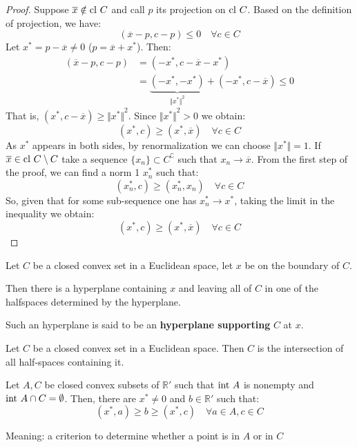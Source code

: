 \documentclass[../main.tex]{subfiles}
\begin{document}
\begin{proof}
    Suppose $\overline{x} \notin \operatorname{cl\,} C$ and call $p$ its projection on $\operatorname{cl\,} C$. Based on the definition of projection, we have:
    \[
        (\overline{x} - p, c - p) \leq 0 \quad \forall c \in C
    \]
    Let $x^* = p - \overline{x} \neq 0$ ($p = \overline{x} + x^*$). Then:
    \begin{align*}
        (\overline{x} - p, c - p) & = (-x^*, c - \overline{x} - x^*)                                                    \\
                                  & = \underbrace{(-x^*, -x^*)}_{{\Vert x^* \Vert}^2} + (-x^*, c - \overline{x}) \leq 0
    \end{align*}
    That is, $(x^*, c - \overline{x}) \geq {\Vert x^* \Vert}^2$. Since ${\Vert x^* \Vert}^2 > 0$ we obtain:
    \[
        (x^*, c)  \geq (x^*, \overline{x}) \quad \forall c \in C
    \]
    As $x^*$ appears in both sides, by renormalization we can choose $\Vert x^* \Vert = 1$. If $\overline{x} \in \operatorname{cl\,} C \setminus  C$ take a sequence  $\{x_n\} \subset C^\complement$ such that $x_n \to \overline{x}$. From the first step of the proof, we can find a norm 1 $x^*_n$ such that:
    \[
        (x^*_n, c) \geq (x^*_n, x_n) \quad \forall c \in C
    \]
    So, given that for some sub-sequence one has $x_n^* \to x^*$, taking the limit in the inequality we obtain:
    \[
        (x^*, c) \geq (x^*, \overline{x}) \quad \forall c \in C
    \]
\end{proof}
\begin{corollary}
    Let $C$ be a closed convex set in a Euclidean space, let $x$ be on the boundary of $C$.

    Then there is a hyperplane containing $x$ and leaving all of $C$ in one of the halfspaces determined by the hyperplane.

    Such an hyperplane is said to be an \textbf{hyperplane supporting} $C$ at $x$.
\end{corollary}
\begin{corollary}
    Let $C$ be a closed convex set in a Euclidean space. Then $C$ is the intersection of all half-spaces containing it.
\end{corollary}

\begin{theorem}
    Let $A, C$ be closed convex subsets of $\mathbb{R}'$ such that $\operatorname{int\,} A$ is nonempty and $\operatorname{int\,} A \cap C = \emptyset$. Then, there are  $x^* \neq 0$ and $b \in \mathbb{R}'$ such that:
    \[
        (x^*, a) \geq b \geq (x^*, c) \quad \forall a \in A, c \in C
    \]
\end{theorem}
Meaning: a criterion to determine whether a point is in $A$ or in $C$
\end{document}
